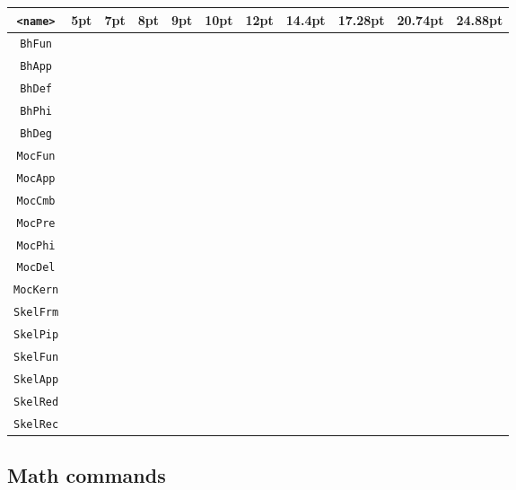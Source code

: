 \def\makesymbolrow#1{{\tiny #1} & {\scriptsize #1} & {\footnotesize #1} & {\small #1} & {\normalsize #1} & {\large #1} & {\Large #1} & {\LARGE #1} & {\huge #1} & {\Huge #1}}
\begin{longtable} { c | c c c c c c c c c c }
  \toprule
  \texttt{<name>}  & \textbf{5pt} & \textbf{7pt} & \textbf{8pt} & \textbf{9pt} & \textbf{10pt} & \textbf{12pt} & \textbf{14.4pt} & \textbf{17.28pt} & \textbf{20.74pt} & \textbf{24.88pt} \\
  \midrule
  \texttt{BhFun} & \makesymbolrow{\textBhFun} \\
  \texttt{BhApp} & \makesymbolrow{\textBhApp} \\
  \texttt{BhDef} & \makesymbolrow{\textBhDef} \\
  \texttt{BhPhi} & \makesymbolrow{\textBhPhi} \\
  \texttt{BhDeg} & \makesymbolrow{\textBhDeg} \\
  \midrule
  \texttt{MocFun} & \makesymbolrow{\textMocFun} \\
  \texttt{MocApp} & \makesymbolrow{\textMocApp} \\
  \texttt{MocCmb} & \makesymbolrow{\textMocCmb} \\
  \texttt{MocPre} & \makesymbolrow{\textMocPre} \\
  \texttt{MocPhi} & \makesymbolrow{\textMocPhi} \\
  \texttt{MocDel} & \makesymbolrow{\textMocDel} \\
  \texttt{MocKern} & \makesymbolrow{\textMocKern} \\
  \midrule
  \texttt{SkelFrm} & \makesymbolrow{\textSkelFrm} \\
  \texttt{SkelPip} & \makesymbolrow{\textSkelPip} \\
  \texttt{SkelFun} & \makesymbolrow{\textSkelFun} \\
  \texttt{SkelApp} & \makesymbolrow{\textSkelApp} \\
  \texttt{SkelRed} & \makesymbolrow{\textSkelRed} \\
  \texttt{SkelRec} & \makesymbolrow{\textSkelRec} \\
  \bottomrule
\end{longtable}

\subsection{Math commands}
\label{sec:miscellaneous}

